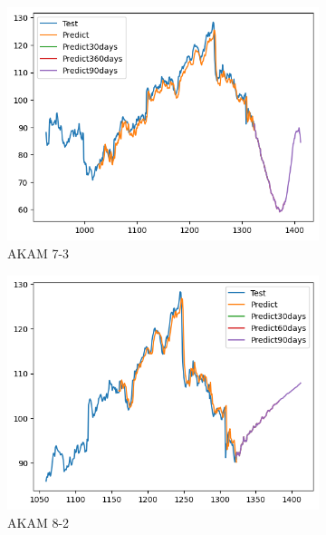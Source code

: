 \documentclass{ieeeojies}
\begin{document}
\begin{figure}[H]
    \centering
    \begin{subfigure}[h]{0.33\linewidth}
        \centering
        \includegraphics[width=\linewidth]{RNN Plot/RNN_AKAM_7_3.png}
        \caption{AKAM 7-3}
        \label{fig:akam-7-3}
    \end{subfigure}%
    \hfill
    \begin{subfigure}[h]{0.33\linewidth}
        \centering
        \includegraphics[width=\linewidth]{RNN Plot/RNN_AKAM_8_2.png}
        \caption{AKAM 8-2}
        \label{fig:akam-8-2}
    \end{subfigure}%
    \hfill
    \begin{subfigure}[h]{0.33\linewidth}

\end{subfigure}
\end{figure}
\end{document}

